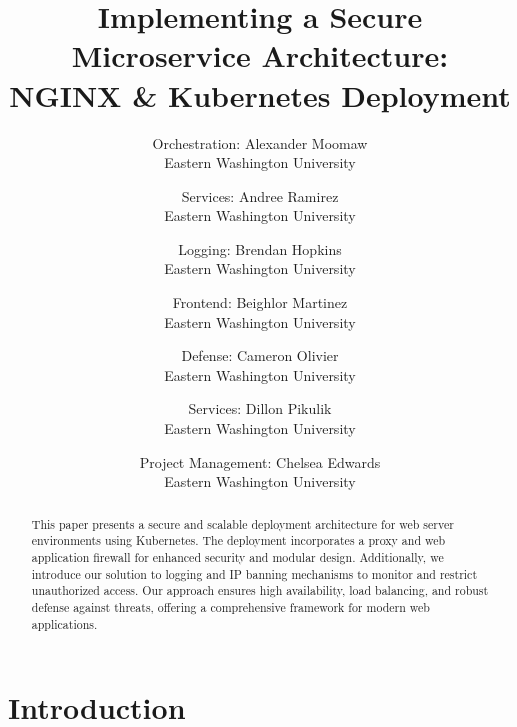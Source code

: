 \documentclass[letterpaper,twocolumn,10pt]{article}
\begin{document}

\date{}

\title{\Large \bf Implementing a Secure Microservice Architecture:\\
  NGINX \& Kubernetes Deployment}

\author{
{\rm Orchestration: Alexander Moomaw}\\
Eastern Washington University
\and
{\rm Services: Andree Ramirez}\\
Eastern Washington University
\and
{\rm Logging: Brendan Hopkins}\\
Eastern Washington University
\and
{\rm Frontend: Beighlor Martinez}\\
Eastern Washington University
\and
{\rm Defense: Cameron Olivier}\\
Eastern Washington University
\and
{\rm Services: Dillon Pikulik}\\
Eastern Washington University
\and
{\rm Project Management: Chelsea Edwards}\\
Eastern Washington University
}

\maketitle
\begin{abstract}
This paper presents a secure and scalable deployment architecture for web server environments using Kubernetes. 
The deployment incorporates a proxy and web application firewall for enhanced security and modular design. 
Additionally, we introduce our solution to logging and IP banning mechanisms to monitor and restrict unauthorized access. 
Our approach ensures high availability, load balancing, and robust defense against threats, offering a comprehensive framework for modern web applications.
\end{abstract}

\section{Introduction}

\end{document}
